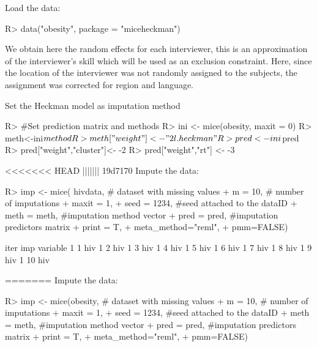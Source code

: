 \documentclass[
]{jss}
\begin{document}
Load the data:

\begin{CodeChunk}
\begin{CodeInput}
R> data("obesity",  package = "miceheckman")
\end{CodeInput}
\end{CodeChunk}

We obtain here the random effects for each interviewer, this is an
approximation of the interviewer's skill which will be used as an
exclusion constraint. Here, since the location of the interviewer was
not randomly assigned to the subjects, the assignment was corrected for
region and language.

Set the Heckman model as imputation method

\begin{CodeChunk}
\begin{CodeInput}
R> #Set prediction matrix and methods
R> ini <- mice(obesity, maxit = 0)
R> meth<-ini$method
R> meth["weight"]<-"2l.heckman"
R> pred <- ini$pred
R> pred["weight","cluster"]<- -2
R> pred["weight","rt"] <- -3
\end{CodeInput}
\end{CodeChunk}

<<<<<<< HEAD
||||||| 19d7170
Impute the data:

\begin{CodeChunk}
\begin{CodeInput}
R> imp <- mice( hivdata, # dataset with missing values
+                         m = 10,   # number of imputations
+                         maxit = 1,
+                         seed = 1234, #seed attached to the dataID
+                         meth = meth, #imputation method vector
+                         pred = pred, #imputation predictors matrix
+                         print = T,
+                         meta_method="reml",
+                         pmm=FALSE)
\end{CodeInput}
\begin{CodeOutput}

 iter imp variable
  1   1  hiv
  1   2  hiv
  1   3  hiv
  1   4  hiv
  1   5  hiv
  1   6  hiv
  1   7  hiv
  1   8  hiv
  1   9  hiv
  1   10  hiv
\end{CodeOutput}
\end{CodeChunk}

=======
Impute the data:

\begin{CodeChunk}
\begin{CodeInput}
R> imp <- mice(obesity, # dataset with missing values
+                         m = 10,   # number of imputations
+                         maxit = 1,
+                         seed = 1234, #seed attached to the dataID
+                         meth = meth, #imputation method vector
+                         pred = pred, #imputation predictors matrix
+                         print = T,
+                         meta_method="reml",
+                         pmm=FALSE)
\end{CodeInput}
\end{CodeChunk}
\end{document}
